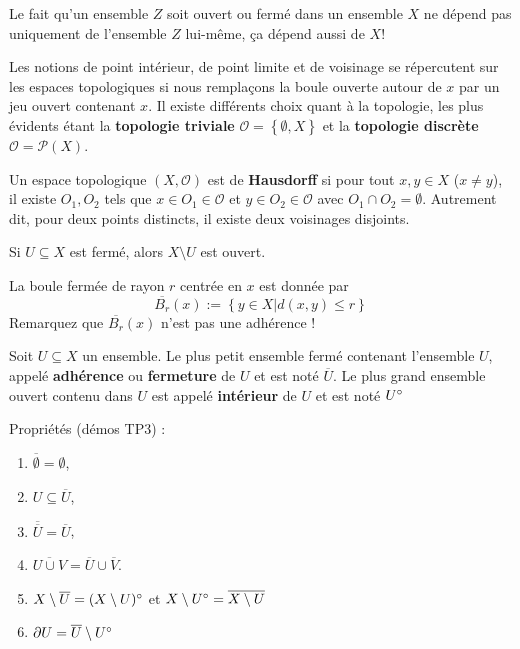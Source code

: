 \begin{remark}
    Le fait qu'un ensemble $Z$ soit ouvert ou fermé dans un ensemble $X$ ne dépend pas uniquement de l'ensemble $Z$ lui-même, ça dépend aussi de $X$!
\end{remark}

Les notions de point intérieur, de point limite et de voisinage se répercutent sur les espaces topologiques si nous remplaçons la boule ouverte autour de $x$ par un jeu ouvert contenant $x$. Il existe différents choix quant à la topologie, les plus évidents étant la \textbf{topologie triviale} $\mathcal{O} = \left\{ \emptyset,X \right\}$ et la \textbf{topologie discrète} $\mathcal{O} = \mathcal{P}(X)$.\\

\begin{definition}
    Un espace topologique $(X,\mathcal{O})$ est de \textbf{Hausdorff} si pour tout $x,y \in X$ ($x\neq y$), il existe $O_1,O_2$ tels que $x\in O_1\in \mathcal{O}$ et $y\in O_2\in \mathcal{O}$ avec $O_1\cap O_2=\emptyset$. Autrement dit, pour deux points distincts, il existe deux voisinages disjoints.
\end{definition}


\begin{theo}
    Si $U\subseteq X$ est fermé, alors $X\setminus U$ est ouvert.
\end{theo}

\begin{definition}
    La boule fermée de rayon $r$ centrée en $x$ est donnée par
    \begin{equation*}
        \overline{B_r}(x) := \left\{ y\in X| d(x,y) \leq r \right\}
    \end{equation*}
    Remarquez que $\overline{B_r}(x)$ n'est pas une adhérence !
\end{definition}

\begin{definition}
    Soit $U\subseteq X$ un ensemble. Le plus petit ensemble fermé contenant l'ensemble $U$, appelé \textbf{adhérence} ou \textbf{fermeture} de $U$ et est noté $\overline{U}$. Le plus grand ensemble ouvert contenu dans $U$ est appelé \textbf{intérieur} de $U$ et est noté $U \degree$
    
    Propriétés (démos TP3) :
    \begin{enumerate}[label=(\roman*)]
        \item $\overline \emptyset = \emptyset$,
        \item $U \subseteq \overline U$,
        \item $\overline{\overline U} = \overline U$,
        \item $\overline{U\cup V} = \overline U \cup \overline V$.
        \item $X \setminus \overline{U} = (X \setminus U)\degree$ et $X \setminus U\degree = \overline{X \setminus U}$
        \item $\partial U = \overline{U} \setminus U\degree$
    \end{enumerate}
\end{definition}


